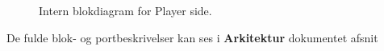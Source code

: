 \documentclass[Rapport/Rapport_main.tex]{subfiles}
\begin{document}
\begin{figure}[H]
    \centering
    \caption{Intern blokdiagram for Player side.}
    \label{fig:rap_playerside_hardware_ibd}
\end{figure}
De fulde blok- og portbeskrivelser kan ses i \textbf{Arkitektur} dokumentet afsnit 
\end{document}
